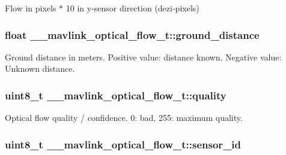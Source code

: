 Flow in pixels $\ast$ 10 in y-\/sensor direction (dezi-\/pixels) 

\hypertarget{struct____mavlink__optical__flow__t_a89b39010e211494ffecc65c29fdd8c0e}{
\subsubsection[{ground\+\_\+distance}]{\setlength{\rightskip}{0pt plus 5cm}float \+\_\+\+\_\+mavlink\+\_\+optical\+\_\+flow\+\_\+t\+::ground\+\_\+distance}}\label{struct____mavlink__optical__flow__t_a89b39010e211494ffecc65c29fdd8c0e}


Ground distance in meters. Positive value\+: distance known. Negative value\+: Unknown distance. 

\hypertarget{struct____mavlink__optical__flow__t_a3efb901fe9c47c88f90ddfb73d76f542}{
\subsubsection[{quality}]{\setlength{\rightskip}{0pt plus 5cm}uint8\+\_\+t \+\_\+\+\_\+mavlink\+\_\+optical\+\_\+flow\+\_\+t\+::quality}}\label{struct____mavlink__optical__flow__t_a3efb901fe9c47c88f90ddfb73d76f542}


Optical flow quality / confidence. 0\+: bad, 255\+: maximum quality. 

\hypertarget{struct____mavlink__optical__flow__t_a196e345c474b8fc63570ebad5f947544}{
\subsubsection[{sensor\+\_\+id}]{\setlength{\rightskip}{0pt plus 5cm}uint8\+\_\+t \+\_\+\+\_\+mavlink\+\_\+optical\+\_\+flow\+\_\+t\+::sensor\+\_\+id}}\label{struct____mavlink__optical__flow__t_a196e345c474b8fc63570ebad5f947544}


